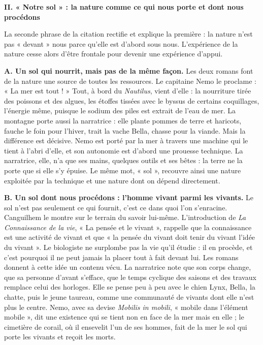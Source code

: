 \documentclass[11pt,a4paper]{article}
\begin{document}
\textbf{II. « Notre sol » : la nature comme ce qui nous porte et dont nous procédons}

La seconde phrase de la citation rectifie et explique la première : la nature n'est pas « devant » nous parce qu'elle est d'abord sous nous. L'expérience de la nature cesse alors d'être frontale pour devenir une expérience d'appui.

\textbf{A. Un sol qui nourrit, mais pas de la même façon.} Les deux romans font de la nature une source de toutes les ressources. Le capitaine Nemo le proclame : « La mer est tout ! » Tout, à bord du \emph{Nautilus}, vient d'elle : la nourriture tirée des poissons et des algues, les étoffes tissées avec le byssus de certains coquillages, l'énergie même, puisque le sodium des piles est extrait de l'eau de mer. La montagne porte aussi la narratrice : elle plante pommes de terre et haricots, fauche le foin pour l'hiver, trait la vache Bella, chasse pour la viande. Mais la différence est décisive. Nemo est porté par la mer à travers une machine qui le tient à l'abri d'elle, et son autonomie est d'abord une prouesse technique. La narratrice, elle, n'a que ses mains, quelques outils et ses bêtes : la terre ne la porte que si elle s'y épuise. Le même mot, « sol », recouvre ainsi une nature exploitée par la technique et une nature dont on dépend directement.

\textbf{B. Un sol dont nous procédons : l'homme vivant parmi les vivants.} Le sol n'est pas seulement ce qui fournit, c'est ce dans quoi l'on s'enracine. Canguilhem le montre sur le terrain du savoir lui-même. L'introduction de \emph{La Connaissance de la vie}, « La pensée et le vivant », rappelle que la connaissance est une activité de vivant et que « la pensée du vivant doit tenir du vivant l'idée du vivant ». Le biologiste ne surplombe pas la vie qu'il étudie : il en procède, et c'est pourquoi il ne peut jamais la placer tout à fait devant lui. Les romans donnent à cette idée un contenu vécu. La narratrice note que son corps change, que sa personne d'avant s'efface, que le temps cyclique des saisons et des travaux remplace celui des horloges. Elle se pense peu à peu avec le chien Lynx, Bella, la chatte, puis le jeune taureau, comme une communauté de vivants dont elle n'est plus le centre. Nemo, avec sa devise \emph{Mobilis in mobili}, « mobile dans l'élément mobile », dit une existence qui se tient non en face de la mer mais en elle ; le cimetière de corail, où il ensevelit l'un de ses hommes, fait de la mer le sol qui porte les vivants et reçoit les morts.
\end{document}
